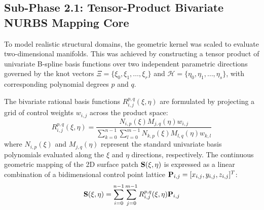 \subsection{Sub-Phase 2.1: Tensor-Product Bivariate NURBS Mapping Core}
\label{subsec:nurbs_2d}

To model realistic structural domains, the geometric kernel was scaled to evaluate two-dimensional manifolds. This was achieved by constructing a tensor product of univariate B-spline basis functions over two independent parametric directions governed by the knot vectors $\Xi = \{\xi_0, \xi_1, \dots, \xi_{r}\}$ and $\mathcal{H} = \{\eta_0, \eta_1, \dots, \eta_{s}\}$, with corresponding polynomial degrees $p$ and $q$.

The bivariate rational basis functions $R_{i,j}^{p,q}(\xi, \eta)$ are formulated by projecting a grid of control weights $w_{i,j}$ across the product space:
\begin{equation}
        R_{i,j}^{p,q}(\xi, \eta) = \frac{N_{i,p}(\xi) M_{j,q}(\eta) w_{i,j}}{\sum_{k=0}^{n-1} \sum_{l=0}^{m-1} N_{k,p}(\xi) M_{l,q}(\eta) w_{k,l}}
\end{equation}
where $N_{i,p}(\xi)$ and $M_{j,q}(\eta)$ represent the standard univariate basis polynomials evaluated along the $\xi$ and $\eta$ directions, respectively. The continuous geometric mapping of the 2D surface patch $\mathbf{S}(\xi, \eta)$ is expressed as a linear combination of a bidimensional control point lattice $\mathbf{P}_{i,j} = [x_{i,j}, y_{i,j}, z_{i,j}]^T$:
\begin{equation}
        \mathbf{S}(\xi, \eta) = \sum_{i=0}^{n-1} \sum_{j=0}^{m-1} R_{i,j}^{p,q}(\xi, \eta) \mathbf{P}_{i,j}
\end{equation}


